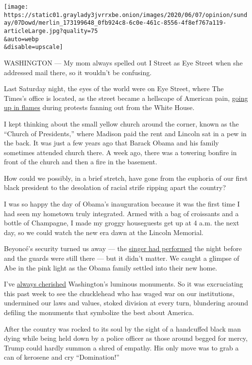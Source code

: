 \texttt{[image: https://static01.graylady3jvrrxbe.onion/images/2020/06/07/opinion/sunday/07Dowd/merlin\_173199648\_0fb924c8-6c0e-461c-8556-4f8ef767a119-articleLarge.jpg?quality=75\\\&auto=webp\\\&disable=upscale]}

WASHINGTON --- My mom always spelled out I Street as Eye Street when she
addressed mail there, so it wouldn't be confusing.

Last Saturday night, the eyes of the world were on Eye Street, where The
Times's office is located, as the street became a hellscape of American
pain,
\href{https://www.nytimes3xbfgragh.onion/2020/05/31/us/politics/washington-dc-george-floyd-protests.html}{going
up in flames} during protests fanning out from the White House.

I kept thinking about the small yellow church around the corner, known
as the ``Church of Presidents,'' where Madison paid the rent and Lincoln
sat in a pew in the back. It was just a few years ago that Barack Obama
and his family sometimes attended church there. A week ago, there was a
towering bonfire in front of the church and then a fire in the basement.

How could we possibly, in a brief stretch, have gone from the euphoria
of our first black president to the desolation of racial strife ripping
apart the country?

I was so happy the day of Obama's inauguration because it was the first
time I had seen my hometown truly integrated. Armed with a bag of
croissants and a bottle of Champagne, I made my groggy houseguests get
up at 4 a.m. the next day, so we could watch the new era dawn at the
Lincoln Memorial.

Beyoncé's security turned us away --- the
\href{https://www.youtube.com/watch?v=yAmydqJmDtY\&t=2s}{singer had
performed} the night before and the guards were still there --- but it
didn't matter. We caught a glimpse of Abe in the pink light as the Obama
family settled into their new home.

I've
\href{https://www.nytimes3xbfgragh.onion/2001/09/16/magazine/our-correspondent-in-washington-dc-my-memorable-monuments.html}{always
cherished} Washington's luminous monuments. So it was excruciating this
past week to see the chucklehead who has waged war on our institutions,
undermined our laws and values, stoked division at every turn,
blundering around defiling the monuments that symbolize the best about
America.

After the country was rocked to its soul by the sight of a handcuffed
black man dying while being held down by a police officer as those
around begged for mercy, Trump could hardly summon a shred of empathy.
His only move was to grab a can of kerosene and cry ``Domination!''

